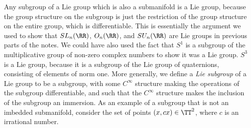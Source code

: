 Any subgroup of a Lie group which is also a submanifold is a Lie group, because the group structure on the subgroup is just the restriction of the group structure on the entire group, which is differentiable. This is essentially the argument we used to show that $SL_n(\RR)$, $O_n(\RR)$, and $SU_n(\RR)$ are Lie groups in previous parts of the notes. We could have also used the fact that $S^1$ is a subgroup of the multiplicative group of non-zero complex numbers to show it was a Lie group. $S^3$ is a Lie group, because it is a subgroup of the Lie group of quaternions, consisting of elements of norm one. More generally, we define a \emph{Lie subgroup} of a Lie group to be a subgroup, with some $C^\infty$ structure making the operations of the subgroup differentiable, and such that the $C^\infty$ structure makes the inclusion of the subgroup an immersion. As an example of a subgroup that is not an imbedded submanifold, consider the set of points $(x,cx) \in \TT^2$, where $c$ is an irrational number.

